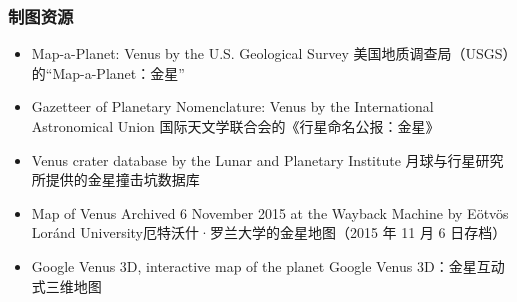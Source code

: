 \subsubsection{制图资源}
\begin{itemize}
\item Map-a-Planet: Venus by the U.S. Geological Survey
美国地质调查局（USGS）的“Map-a-Planet：金星”
\item Gazetteer of Planetary Nomenclature: Venus by the International Astronomical Union 国际天文学联合会的《行星命名公报：金星》
\item Venus crater database by the Lunar and Planetary Institute 月球与行星研究所提供的金星撞击坑数据库
\item Map of Venus Archived 6 November 2015 at the Wayback Machine by Eötvös Loránd University厄特沃什·罗兰大学的金星地图（2015 年 11 月 6 日存档）
\item Google Venus 3D, interactive map of the planet Google Venus 3D：金星互动式三维地图
\end{itemize}

